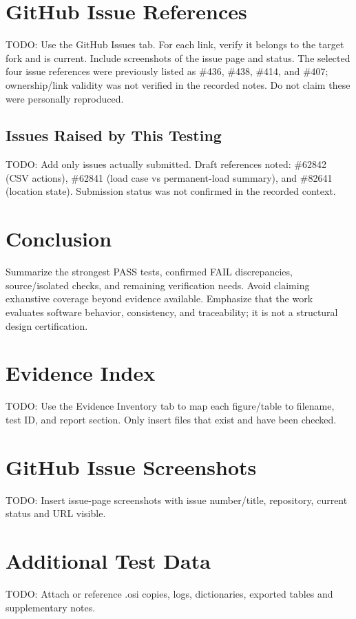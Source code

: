 \documentclass[11pt,a4paper]{report}
\begin{document}
\chapter{GitHub Issue References}
TODO: Use the GitHub Issues tab. For each link, verify it belongs to the target fork and is current. Include screenshots of the issue page and status. The selected four issue references were previously listed as \#436, \#438, \#414, and \#407; ownership/link validity was not verified in the recorded notes. Do not claim these were personally reproduced.
\section{Issues Raised by This Testing}
TODO: Add only issues actually submitted. Draft references noted: \#62842 (CSV actions), \#62841 (load case vs permanent-load summary), and \#82641 (location state). Submission status was not confirmed in the recorded context.

\chapter{Conclusion}
Summarize the strongest PASS tests, confirmed FAIL discrepancies, source/isolated checks, and remaining verification needs. Avoid claiming exhaustive coverage beyond evidence available. Emphasize that the work evaluates software behavior, consistency, and traceability; it is not a structural design certification.

\appendix
\chapter{Evidence Index}
TODO: Use the Evidence Inventory tab to map each figure/table to filename, test ID, and report section. Only insert files that exist and have been checked.
\chapter{GitHub Issue Screenshots}
TODO: Insert issue-page screenshots with issue number/title, repository, current status and URL visible.
\chapter{Additional Test Data}
TODO: Attach or reference .osi copies, logs, dictionaries, exported tables and supplementary notes.
\end{document}
